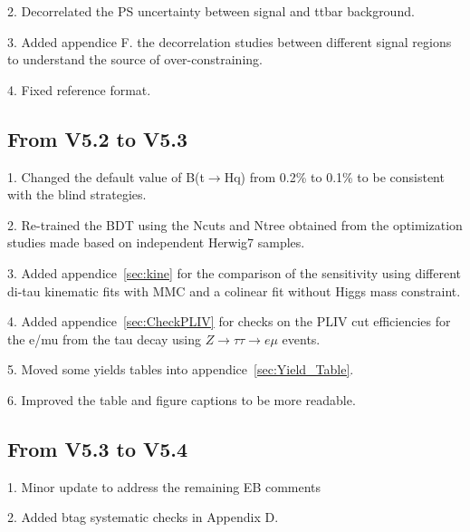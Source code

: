 2. Decorrelated the PS uncertainty between signal and ttbar background.

3. Added appendice F. the decorrelation studies between different signal regions to understand the source of over-constraining.

4. Fixed reference format.

\subsection{From V5.2 to V5.3}

1. Changed the default value of B(t$\rightarrow$Hq) from 0.2\% to 0.1\% to be consistent with the blind strategies.

2. Re-trained the BDT using the Ncuts and Ntree obtained from the optimization studies made based on independent Herwig7 samples.

3. Added appendice~\ref{sec:kine} for the comparison of the sensitivity using different di-tau kinematic fits with MMC and a colinear fit without Higgs mass constraint.

4. Added appendice~\ref{sec:CheckPLIV} for checks on the PLIV cut efficiencies for the e/mu from the tau decay using $Z\rightarrow\tau\tau\rightarrow e\mu$ events.

5. Moved some yields tables into appendice~\ref{sec:Yield_Table}.

6. Improved the table and figure captions to be more readable. 


\subsection{From V5.3 to V5.4}

1. Minor update to address the remaining EB comments

2. Added btag systematic checks in Appendix D. 
